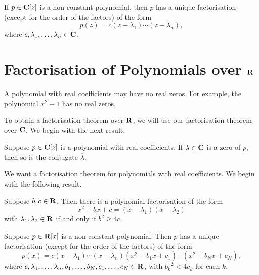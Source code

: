 \begin{theorem}
If $p\in\mathbf C[z]$ is a non-constant polynomial, then $p$ has a unique factorisation (except for the order of the factors) of the form
\[p(z)=c(z-\lambda_1)\cdots(z-\lambda_n),\]
where $c,\lambda_1,\dots,\lambda_n\in\mathbf C$.
\end{theorem}
\pagebreak

\section{Factorisation of Polynomials over $\mathbf R$}
A polynomial with real coefficients may have no real zeros. For example, the polynomial $x^2+1$ has no real zeros.

To obtain a factorisation theorem over $\mathbf R$, we will use our factorisation theorem over $\mathbf C$. We begin with the next result.

\begin{proposition}
Suppose $p\in\mathbf C[z]$ is a polynomial with real coefficients. If $\lambda\in\mathbf C$ is a zero of $p$, then so is the conjugate $\overline{\lambda}$.
\end{proposition}

We want a factorisation theorem for polynomials with real coefficients. We begin with the following result.

\begin{lemma}
Suppose $b,c\in\mathbf R$. Then there is a polynomial factorisation of the form
\[x^2+bx+c=(x-\lambda_1)(x-\lambda_2)\]
with $\lambda_1,\lambda_2\in\mathbf R$ if and only if $b^2\ge 4c$.
\end{lemma}

\begin{theorem}
Suppose $p\in\mathbf R[x]$ is a non-constant polynomial. Then $p$ has a unique factorisation (except for the order of the factors) of the form
\[p(x)=c(x-\lambda_1)\cdots(x-\lambda_n)(x^2+b_1x+c_1)\cdots(x^2+b_Nx+c_N),\]
where $c,\lambda_1,\dots,\lambda_n,b_1,\dots,b_N,c_1,\dots,c_N\in\mathbf R$, with ${b_k}^2<4c_k$ for each $k$.
\end{theorem}